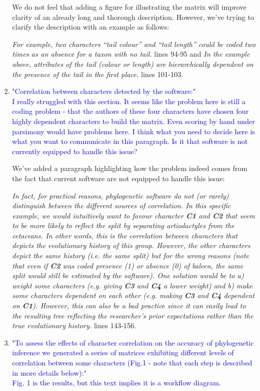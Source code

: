 \documentclass[12pt,letterpaper]{article}
\begin{document}
\begin{enumerate}
We do not feel that adding a figure for illustrating the matrix will improve clarity of an already long and thorough description.
However, we've trying to clarify the description with an example as follows:

\textit{For example, two characters ``tail colour'' and ``tail length'' could be coded two times as an absence for a taxon with no tail.} lines 94-95 and \textit{In the example above, attributes of the tail (colour or length) are hierarchically dependent on the presence of the tail in the first place.} lines 101-103.

\item{\textcolor{blue}{"Correlation between characters detected by the software:"\\
I really struggled with this section. It seems like the problem here is still a coding problem - that the authors of these four characters have chosen four highly dependent characters to build the matrix. Even scoring by hand under parsimony would have problems here. I think what you need to decide here is what you want to communicate in this paragraph. Is it that software is not currently equipped to handle this issue?}}

We've added a paragraph highlighting how the problem indeed comes from the fact that current software are not equipped to handle this issue:

\textit{In fact, for practical reasons, phylogenetic software do not (or rarely) distinguish between the different sources of correlation.
In this specific example, we would intuitively want to favour character \textbf{C1} and \textbf{C2} that seem to be more likely to reflect the split by separating artiodactyles from the cetaceans.
In other words, this is the correlation between characters that depicts the evolutionary history of this group.
However, the other characters depict the same history (i.e. the same split) but for the wrong reasons (note that even if \textbf{C2} was coded presence (1) or absence (0) of baleen, the same split would still be estimated by the software).
One solution would be to a) weight some characters (e.g. giving \textbf{C3} and \textbf{C4} a lower weight) and b) make some characters dependent on each other (e.g. making \textbf{C3} and \textbf{C4} dependent on \textbf{C1}).
However, this can also be a bad practice since it can easily lead to the resulting tree reflecting the researcher's prior expectations rather than the true evolutionary history.} lines 143-156.

\item{\textcolor{blue}{"To assess the effects of character correlation on the accuracy of phylogenetic inference we generated a series of matrices exhibiting different levels of correlation between some characters (Fig.1 - note that each step is described in more details below):"\\
Fig. 1 is the results, but this text implies it is a workflow diagram.}}


\end{enumerate}
\end{document}
